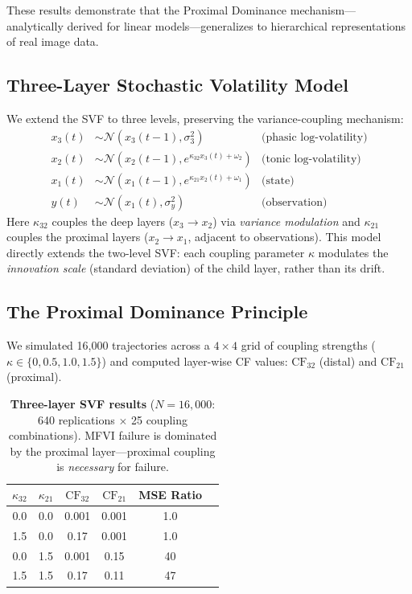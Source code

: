 \documentclass[10pt]{article} %
\theoremstyle{plain}
\theoremstyle{definition}
\begin{document}
\noindent These results demonstrate that the Proximal Dominance mechanism---analytically derived for linear models---generalizes to hierarchical representations of real image data.

\subsection{Three-Layer Stochastic Volatility Model}
\label{sec:three-layer}

We extend the SVF to three levels, preserving the variance-coupling mechanism:
\begin{align}
x_3(t) &\sim \mathcal{N}(x_3(t-1), \sigma_3^2) & \text{(phasic log-volatility)} \\
x_2(t) &\sim \mathcal{N}(x_2(t-1), e^{\kappa_{32} x_3(t) + \omega_2}) & \text{(tonic log-volatility)} \\
x_1(t) &\sim \mathcal{N}(x_1(t-1), e^{\kappa_{21} x_2(t) + \omega_1}) & \text{(state)} \\
y(t) &\sim \mathcal{N}(x_1(t), \sigma_y^2) & \text{(observation)}
\end{align}
Here $\kappa_{32}$ couples the deep layers ($x_3 \to x_2$) via \emph{variance modulation} and $\kappa_{21}$ couples the proximal layers ($x_2 \to x_1$, adjacent to observations). This model directly extends the two-level SVF: each coupling parameter $\kappa$ modulates the \emph{innovation scale} (standard deviation) of the child layer, rather than its drift.

\subsection{The Proximal Dominance Principle}

We simulated 16,000 trajectories across a $4 \times 4$ grid of coupling strengths ($\kappa \in \{0, 0.5, 1.0, 1.5\}$) and computed layer-wise CF values: $\text{CF}_{32}$ (distal) and $\text{CF}_{21}$ (proximal).

\begin{table}[!htbp]
\centering
\caption{\textbf{Three-layer SVF results} ($N = 16{,}000$: 640 replications $\times$ 25 coupling combinations). MFVI failure is dominated by the proximal layer---proximal coupling is \emph{necessary} for failure.}
\label{tab:3layer}
\begin{tabular}{@{}cccccc@{}}
\toprule
$\kappa_{32}$ & $\kappa_{21}$ & $\text{CF}_{32}$ & $\text{CF}_{21}$ & MSE Ratio \\
\midrule
0.0 & 0.0 & 0.001 & 0.001 & 1.0 \\
1.5 & 0.0 & 0.17 & 0.001 & 1.0 \\
0.0 & 1.5 & 0.001 & 0.15 & 40 \\
1.5 & 1.5 & 0.17 & 0.11 & 47 \\
\bottomrule
\end{tabular}
\end{table}
\end{document}
